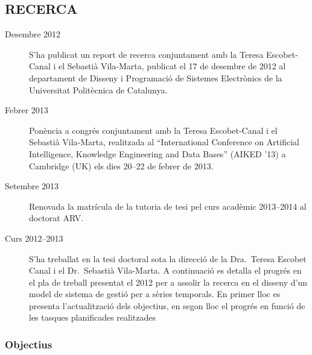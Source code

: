 \subsection*{RECERCA}

\begin{description}


\item[Desembre 2012] S'ha publicat un report de
  recerca \parencite{llusa12:report} conjuntament amb la Teresa
  Escobet-Canal i el Sebastià Vila-Marta, publicat el 17 de desembre
  de 2012 al departament de Disseny i Programació de Sistemes
  Electrònics de la Universitat Politècnica de Catalunya.


\item[Febrer 2013] Ponència a congrés \parencite{llusa13:aiked}
  conjuntament amb la Teresa Escobet-Canal i el Sebastià Vila-Marta,
  realitzada al ``International Conference on Artificial Intelligence,
  Knowledge Engineering and Data Bases'' (AIKED '13) a Cambridge (UK)
  els dies 20--22 de febrer de 2013.  


\item[Setembre 2013] Renovada la matrícula de la tutoria de tesi pel
  curs acadèmic 2013--2014 al doctorat ARV.




\item[Curs 2012--2013] S'ha treballat en la tesi doctoral sota la
  direcció de la Dra.\ Teresa Escobet Canal i el Dr.\ Sebastià
  Vila-Marta. A continuació es detalla el progrés en el pla de treball
  presentat el 2012 per a assolir la recerca en el disseny d'un model
  de sistema de gestió per a sèries temporals. En primer lloc es
  presenta l'actualització dels objectius, en segon lloc el progrés en
  funció de les tasques planificades realitzades


\end{description}



\subsubsection*{Objectius}


